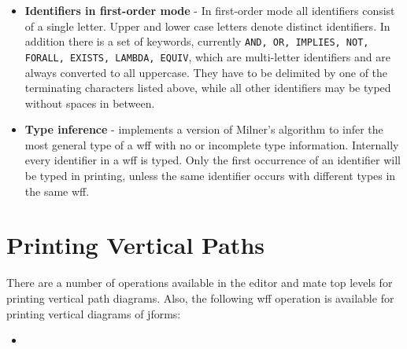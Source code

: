 \begin{itemize}
\item {\bf Identifiers in first-order mode} - In first-order mode all identifiers
consist of a single letter.  Upper and lower case letters denote 
distinct identifiers.  In addition there is a set of keywords,
currently {\tt AND, OR, IMPLIES, NOT, FORALL, EXISTS, LAMBDA, EQUIV},
which are multi-letter identifiers and are always converted to all
uppercase.  They have to be delimited by one of the terminating
characters listed above, while all other identifiers may be typed without
spaces in between.

\item {\bf Type inference} - \TPS implements a version of Milner's algorithm
to infer the most general type of a wff with no or incomplete
type information.  Internally every identifier in a wff is typed.
Only the first occurrence
of an identifier will be typed in printing, unless the same identifier occurs
with different types in the same wff.
\end{itemize}

\section{Printing Vertical Paths} %

There are a number of operations available in the editor and mate top levels
for printing vertical path diagrams. Also,
the following wff operation is available for printing vertical diagrams
of jforms:

\begin{itemize}
\item {}
\end{itemize}

